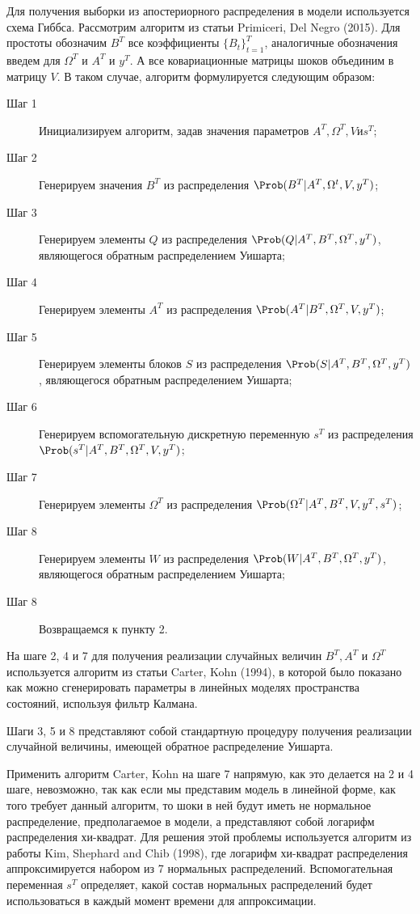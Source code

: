 Для получения выборки из апостериорного распределения в модели  используется схема Гиббса. Рассмотрим алгоритм из статьи Primiceri, Del Negro (2015). Для простоты обозначим $B^T$ все коэффициенты $\{B_t\}_{t=1}^{T}$, аналогичные обозначения введем для $\Omega^T$ и $A^T$ и $y^T$. А все ковариационные матрицы шоков объединим в матрицу $V$. В таком случае, алгоритм формулируется следующим образом:
\begin{description}
\item[Шаг 1] Инициализируем алгоритм, задав значения параметров $A^T, \Omega^T, V и s^T$;
\item[Шаг 2] Генерируем значения $B^T$ из распределения $\Prob(B^T|A^T, \Omega^t, V, y^T)$;
\item[Шаг 3] Генерируем элементы $Q$ из распределения $\Prob(Q|A^T, B^T, \Omega^T, y^T)$, являющегося обратным распределением Уишарта;
\item[Шаг 4] Генерируем элементы $A^T$ из распределения $\Prob (A^T|B^T, \Omega^T, V, y^T)$;
\item[Шаг 5] Генерируем элементы блоков $S$ из распределения $\Prob(S|A^T, B^T, \Omega^T, y^T)$, являющегося обратным распределением Уишарта;
\item[Шаг 6] Генерируем вспомогательную дискретную переменную $s^T$ из распределения $\Prob(s^T|A^T, B^T, \Omega^T, V, y^T)$;
\item[Шаг 7] Генерируем элементы $\Omega^T$ из распределения $\Prob(\Omega^T|A^T, B^T, V, y^T, s^T)$; 
\item[Шаг 8] Генерируем элементы $W$ из распределения $\Prob(W|A^T, B^T, \Omega^T, y^T)$, являющегося обратным распределением Уишарта;
\item[Шаг 8] Возвращаемся к пункту 2.
\end{description}
 
На шаге 2, 4 и 7 для получения реализации случайных величин $B^T, A^T$ и $\Omega^T$ используется алгоритм из статьи Carter, Kohn (1994), в которой было показано как можно сгенерировать параметры в линейных моделях пространства состояний, используя фильтр Калмана. 

Шаги 3, 5 и 8 представляют собой стандартную процедуру получения реализации случайной величины, имеющей обратное распределение Уишарта.

Применить алгоритм Carter, Kohn на шаге 7 напрямую, как это делается на 2 и 4 шаге, невозможно, так как если мы представим модель в линейной форме, как того требует данный алгоритм, то шоки в ней будут иметь не нормальное распределение, предполагаемое в модели, а представляют собой логарифм распределения хи-квадрат. Для решения этой проблемы используется алгоритм из работы Kim, Shephard and Chib (1998), где логарифм хи-квадрат распределения аппроксимируется набором из 7 нормальных распределений. Вспомогательная переменная $s^T$ определяет, какой состав нормальных распределений будет использоваться в каждый момент времени для аппроксимации.
